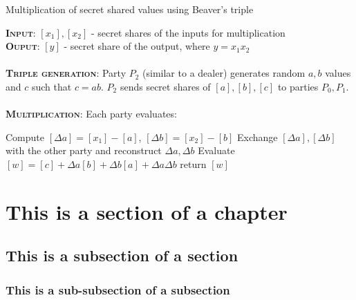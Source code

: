 \begin{algorithm}
    \caption{Multiplication of secret shared values using Beaver's triple}
    \label{alg:beaver_mult}

    \textbf{\textsc{Input}}: $[x_1], [x_2]$ - secret shares of the inputs for multiplication
    \\
    \textbf{\textsc{Ouput}}: $[y]$ - secret share of the output, where $y=x_1x_2$
    \\
    \\
    \textbf{\textsc{Triple generation}}: Party $P_2$ (similar to a dealer) generates random $a,b$ values and $c$ such that $c=ab$. $P_2$ sends secret shares of $[a],[b],[c]$ to parties $P_0, P_1$.
    \\
    \\
    \textbf{\textsc{Multiplication}}: Each party evaluates:

    \begin{algorithmic}
         
        \State Compute $[\Delta a] = [x_1] - [a]$, $[\Delta b] = [x_2] - [b]$
        \State Exchange $[\Delta a], [\Delta b]$ with the other party and reconstruct $\Delta a, \Delta b$
        \State Evaluate $[w] = [c] + \Delta a [b] + \Delta b [a] + \Delta a \Delta b$
        \State return $[w]$
        
    \end{algorithmic}

\end{algorithm}

\section{This is a section of a chapter}
\label{sec:intro:section}

\lipsum[7]

\subsection{This is a subsection of a section}
\label{sec:intro:subsection}

\lipsum[8]

\subsubsection{This is a sub-subsection of a subsection}
\label{sec:intro:subsubsection}

\lipsum[9]